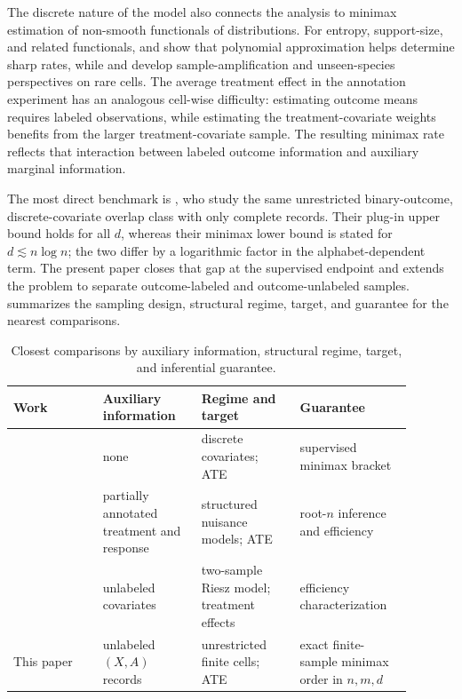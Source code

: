\documentclass[11pt]{article}
\begin{document}
The discrete nature of the model also connects the analysis to minimax estimation of non-smooth functionals of distributions. For entropy, support-size, and related functionals, \citet{JiaoVenkatHanWeissman2015} and \citet{WuYang2016} show that polynomial approximation helps determine sharp rates, while \citet{ValiantValiant2017} and \citet{OrlitskySureshWu2016} develop sample-amplification and unseen-species perspectives on rare cells. The average treatment effect in the annotation experiment has an analogous cell-wise difficulty: estimating outcome means requires labeled observations, while estimating the treatment-covariate weights benefits from the larger treatment-covariate sample. The resulting minimax rate reflects that interaction between labeled outcome information and auxiliary marginal information.

The most direct benchmark is \citet[Theorems 1--2 and the discussion following Theorem 2]{ZengBalakrishnanHanKennedy2024}, who study the same unrestricted binary-outcome, discrete-covariate overlap class with only complete records. Their plug-in upper bound holds for all \(d\), whereas their minimax lower bound is stated for \(d\lesssim n\log n\); the two differ by a logarithmic factor in the alphabet-dependent term. The present paper closes that gap at the supervised endpoint and extends the problem to separate outcome-labeled and outcome-unlabeled samples.  summarizes the sampling design, structural regime, target, and guarantee for the nearest comparisons.

\begin{table}[t]
\centering
\small
\begin{tabular}{p{0.20\linewidth}p{0.22\linewidth}p{0.22\linewidth}p{0.25\linewidth}}
\hline
Work & Auxiliary information & Regime and target & Guarantee \\
\hline
\citet{ZengBalakrishnanHanKennedy2024} & none & discrete covariates; ATE & supervised minimax bracket \\
\citet{HouMukherjeeCai2025} & partially annotated treatment and response & structured nuisance models; ATE & root-\(n\) inference and efficiency \\
\citet{Kato2025} & unlabeled covariates & two-sample Riesz model; treatment effects & efficiency characterization \\
This paper & unlabeled \((X,A)\) records & unrestricted finite cells; ATE & exact finite-sample minimax order in \(n,m,d\) \\
\hline
\end{tabular}
\caption{Closest comparisons by auxiliary information, structural regime, target, and inferential guarantee.}
\label{tab:closest-comparisons}
\end{table}
\end{document}
